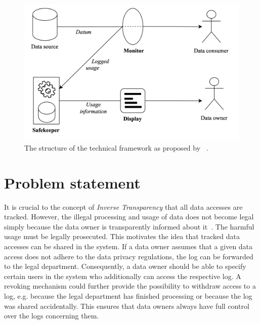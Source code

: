 \documentclass[../main.tex]{subfiles}
\begin{document}
\begin{figure}[ht]
    \includegraphics[scale=0.16]{../img/01/toolchain.png}
    \centering
    \caption[Existing toolchain]{The structure of the technical framework as proposed by \citeauthor{Zieglmeier2021}~\cite{Zieglmeier2021}.}
    \label{fig:toolchain}
\end{figure}

\section{Problem statement}

It is crucial to the concept of \emph{Inverse Transparency} that all data accesses are tracked.
However, the illegal processing and usage of data does not become legal simply because the data owner is transparently informed about it~\cite{Boes2022}.
The harmful usage must be legally prosecuted.
This motivates the idea that tracked data accesses can be shared in the system.
If a data owner assumes that a given data access does not adhere to the data privacy regulations, the log can be forwarded to the legal department.
Consequently, a data owner should be able to specify certain users in the system who additionally can access the respective log.
A revoking mechanism could further provide the possibility to withdraw access to a log, e.g. because the legal department has finished processing or because the log was shared accidentally.
This ensures that data owners always have full control over the logs concerning them.
\end{document}

